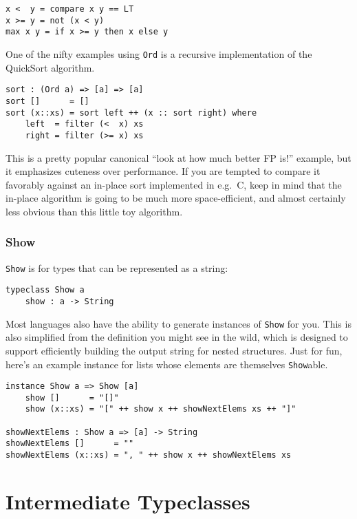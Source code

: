 \documentclass{book}
\newcommand{\mlil}[1]{\lstinline[language=pseudoml,columns=fixed]|#1|}\usepackage{caption}
\begin{document}
\begin{lstlisting}[language=pseudoml]
x <  y = compare x y == LT
x >= y = not (x < y)
max x y = if x >= y then x else y
\end{lstlisting}

One of the nifty examples using \mlil{Ord} is a recursive implementation of the QuickSort algorithm.

\begin{lstlisting}[language=pseudoml]
sort : (Ord a) => [a] => [a]
sort []      = []
sort (x::xs) = sort left ++ (x :: sort right) where
    left  = filter (<  x) xs
    right = filter (>= x) xs
\end{lstlisting}

This is a pretty popular canonical ``look at how much better FP is!'' example, but it emphasizes cuteness over performance. If you are tempted to compare it favorably against an in-place sort implemented in e.g.\ C, keep in mind that the in-place algorithm is going to be much more space-efficient, and almost certainly less obvious than this little toy algorithm.

\subsection{Show}

\mlil{Show} is for types that can be represented as a string:

\begin{lstlisting}[language=pseudoml]
typeclass Show a
    show : a -> String
\end{lstlisting}

Most languages also have the ability to generate instances of \mlil{Show} for you. This is also simplified from the definition you might see in the wild, which is designed to support efficiently building the output string for nested structures. Just for fun, here's an example instance for lists whose elements are themselves \mlil{Show}able.

\begin{lstlisting}[language=pseudoml]
instance Show a => Show [a]
    show []      = "[]"
    show (x::xs) = "[" ++ show x ++ showNextElems xs ++ "]"

showNextElems : Show a => [a] -> String
showNextElems []      = ""
showNextElems (x::xs) = ", " ++ show x ++ showNextElems xs
\end{lstlisting}

\chapter{Intermediate Typeclasses}
\end{document}
